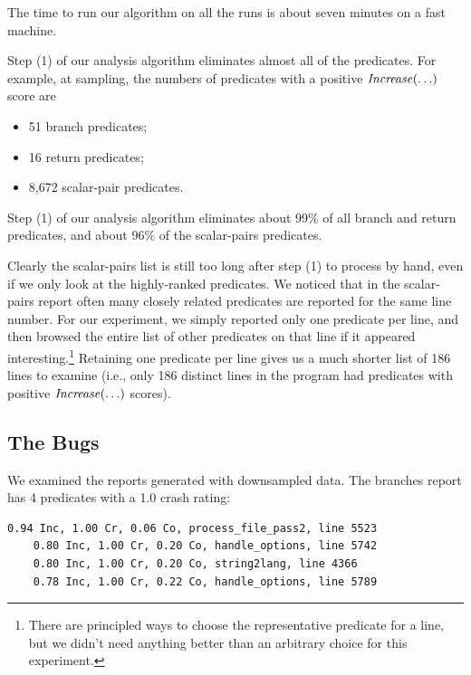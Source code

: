 The time to run our algorithm on all the runs is about seven minutes on
a fast machine.

Step (1) of our analysis algorithm eliminates almost all of the
predicates.  For example, at  sampling, the numbers
of predicates with a positive
$\mbox{\textit{Increase}}(\ldots)$ score are
\begin{itemize}
\item 51 branch predicates;

\item 16 return predicates;

\item 8,672 scalar-pair predicates.
\end{itemize}
Step (1) of our analysis algorithm eliminates about 99\% of
all branch and return predicates, and about 96\% of the scalar-pairs
predicates.  

Clearly the scalar-pairs list is still too long after step (1) to
process by hand, even if we only look at the highly-ranked predicates.
We noticed that in the scalar-pairs report often many closely related
predicates are reported for the same line number.  For our experiment,
we simply reported only one predicate per line, and then browsed the
entire list of other predicates on that line if it appeared
interesting.\footnote{There are principled ways to choose the
representative predicate for a line, but we didn't need anything
better than an arbitrary choice for this experiment.}  Retaining one
predicate per line gives us a much shorter list of 186 lines to
examine (i.e., only 186 distinct lines in the program had predicates
with positive $\mbox{\textit{Increase}}(\ldots)$ scores).

\subsection{The Bugs}

We examined the reports generated with  downsampled data.
The branches report has 4 predicates with a 1.0 crash rating:
\begin{small}
  \begin{BVerbatim}[gobble=4]
    0.94 Inc, 1.00 Cr, 0.06 Co, process_file_pass2, line 5523
    0.80 Inc, 1.00 Cr, 0.20 Co, handle_options, line 5742
    0.80 Inc, 1.00 Cr, 0.20 Co, string2lang, line 4366
    0.78 Inc, 1.00 Cr, 0.22 Co, handle_options, line 5789
  \end{BVerbatim}
\end{small}

